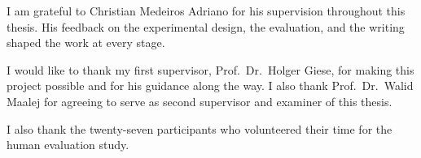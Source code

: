 I am grateful to Christian Medeiros Adriano for his supervision throughout
this thesis. His feedback on the experimental design, the evaluation, and the
writing shaped the work at every stage.

I would like to thank my first supervisor, Prof.\ Dr.\ Holger Giese, for
making this project possible and for his guidance along the way. I also
thank Prof.\ Dr.\ Walid Maalej for agreeing to serve as second supervisor
and examiner of this thesis.

I also thank the twenty-seven participants who volunteered their time for
the human evaluation study.
